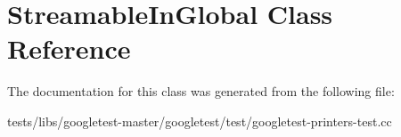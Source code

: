 \hypertarget{classStreamableInGlobal}{}\section{Streamable\+In\+Global Class Reference}
\label{classStreamableInGlobal}


The documentation for this class was generated from the following file\+:\begin{DoxyCompactItemize}
\item 
tests/libs/googletest-\/master/googletest/test/googletest-\/printers-\/test.\+cc\end{DoxyCompactItemize}
